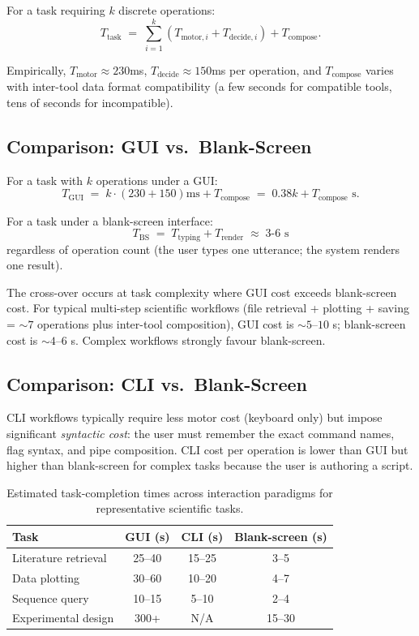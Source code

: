 \documentclass[11pt,twocolumn,a4paper]{article}
\theoremstyle{definition}
\theoremstyle{remark}
\begin{document}
For a task requiring $k$ discrete operations:
\begin{equation}
\label{eq:total}
T_{\text{task}} \;=\; \sum_{i=1}^k (T_{\text{motor},i} + T_{\text{decide},i}) + T_{\text{compose}}.
\end{equation}

Empirically, $T_{\text{motor}} \approx 230$ms, $T_{\text{decide}} \approx 150$ms per operation, and $T_{\text{compose}}$ varies with inter-tool data format compatibility (a few seconds for compatible tools, tens of seconds for incompatible).

\subsection{Comparison: GUI vs.\ Blank-Screen}

For a task with $k$ operations under a GUI:
\[
T_{\text{GUI}} \;=\; k \cdot (230 + 150)\text{ms} + T_{\text{compose}} \;=\; 0.38k + T_{\text{compose}}\text{ s}.
\]

For a task under a blank-screen interface:
\[
T_{\text{BS}} \;=\; T_{\text{typing}} + T_{\text{render}} \;\approx\; 3\text{-}6\text{ s}
\]
regardless of operation count (the user types one utterance; the system renders one result).

The cross-over occurs at task complexity where GUI cost exceeds blank-screen cost. For typical multi-step scientific workflows (file retrieval + plotting + saving = $\sim 7$ operations plus inter-tool composition), GUI cost is $\sim 5$--$10$ s; blank-screen cost is $\sim 4$--$6$ s. Complex workflows strongly favour blank-screen.

\subsection{Comparison: CLI vs.\ Blank-Screen}

CLI workflows typically require less motor cost (keyboard only) but impose significant \emph{syntactic cost}: the user must remember the exact command names, flag syntax, and pipe composition. CLI cost per operation is lower than GUI but higher than blank-screen for complex tasks because the user is authoring a script.

\begin{table}[t]
\centering
\small
\begin{tabular}{lccc}
\toprule
Task & GUI (s) & CLI (s) & Blank-screen (s) \\
\midrule
Literature retrieval & 25--40 & 15--25 & 3--5 \\
Data plotting & 30--60 & 10--20 & 4--7 \\
Sequence query & 10--15 & 5--10 & 2--4 \\
Experimental design & 300+ & N/A & 15--30 \\
\bottomrule
\end{tabular}
\caption{Estimated task-completion times across interaction paradigms for representative scientific tasks.}
\label{tab:times}
\end{table}
\end{document}
